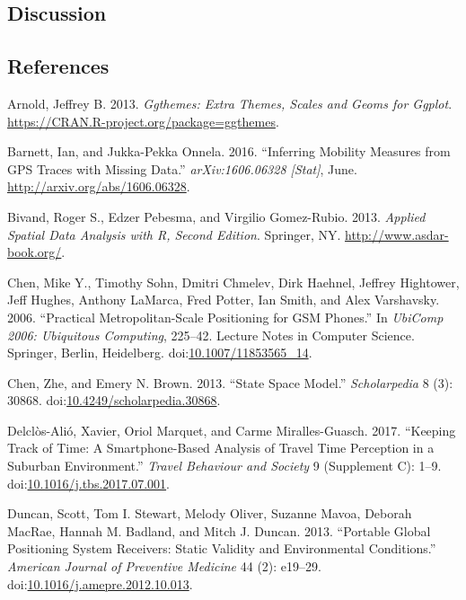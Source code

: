\documentclass[]{article}
\begin{document}
\subsection{Discussion}\label{discussion}

\subsection*{References}\label{references}

\hypertarget{refs}{}
\hypertarget{ref-ggthemes}{}
Arnold, Jeffrey B. 2013. \emph{Ggthemes: Extra Themes, Scales and Geoms
for Ggplot}. \url{https://CRAN.R-project.org/package=ggthemes}.

\hypertarget{ref-barnett_inferring_2016}{}
Barnett, Ian, and Jukka-Pekka Onnela. 2016. ``Inferring Mobility
Measures from GPS Traces with Missing Data.'' \emph{arXiv:1606.06328
{[}Stat{]}}, June. \url{http://arxiv.org/abs/1606.06328}.

\hypertarget{ref-sp2}{}
Bivand, Roger S., Edzer Pebesma, and Virgilio Gomez-Rubio. 2013.
\emph{Applied Spatial Data Analysis with R, Second Edition}. Springer,
NY. \url{http://www.asdar-book.org/}.

\hypertarget{ref-chen_practical_2006}{}
Chen, Mike Y., Timothy Sohn, Dmitri Chmelev, Dirk Haehnel, Jeffrey
Hightower, Jeff Hughes, Anthony LaMarca, Fred Potter, Ian Smith, and
Alex Varshavsky. 2006. ``Practical Metropolitan-Scale Positioning for
GSM Phones.'' In \emph{UbiComp 2006: Ubiquitous Computing}, 225--42.
Lecture Notes in Computer Science. Springer, Berlin, Heidelberg.
doi:\href{https://doi.org/10.1007/11853565_14}{10.1007/11853565\_14}.

\hypertarget{ref-chen_state_2013}{}
Chen, Zhe, and Emery N. Brown. 2013. ``State Space Model.''
\emph{Scholarpedia} 8 (3): 30868.
doi:\href{https://doi.org/10.4249/scholarpedia.30868}{10.4249/scholarpedia.30868}.

\hypertarget{ref-delclos-alio_keeping_2017}{}
Delclòs-Alió, Xavier, Oriol Marquet, and Carme Miralles-Guasch. 2017.
``Keeping Track of Time: A Smartphone-Based Analysis of Travel Time
Perception in a Suburban Environment.'' \emph{Travel Behaviour and
Society} 9 (Supplement C): 1--9.
doi:\href{https://doi.org/10.1016/j.tbs.2017.07.001}{10.1016/j.tbs.2017.07.001}.

\hypertarget{ref-duncan_portable_2013}{}
Duncan, Scott, Tom I. Stewart, Melody Oliver, Suzanne Mavoa, Deborah
MacRae, Hannah M. Badland, and Mitch J. Duncan. 2013. ``Portable Global
Positioning System Receivers: Static Validity and Environmental
Conditions.'' \emph{American Journal of Preventive Medicine} 44 (2):
e19--29.
doi:\href{https://doi.org/10.1016/j.amepre.2012.10.013}{10.1016/j.amepre.2012.10.013}.
\end{document}
